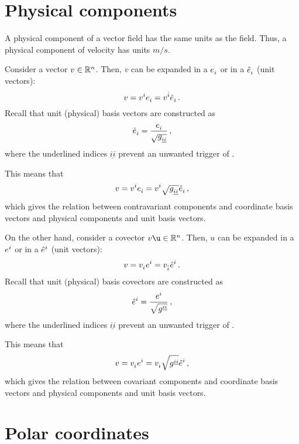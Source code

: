 \section{Physical components}
\label{sec:physical-components}

A physical component of a vector field has the same units as the field. Thus, a physical component of velocity has units $\si{m/s}$.

Consider a vector $v\in\mathbb{R}^n$. Then, $v$ can be expanded in a  $\tbvec i$ or in a  $\pbvec i$ (unit vectors):
%
\begin{equation*}
  v = \tvec vi\tbvec i = \pvec vi\pbvec i\,.
\end{equation*}
%
Recall that unit (physical) basis vectors are constructed as
%
\begin{equation*}
  \pbvec i = \dfrac{\tbvec i}{\sqrt{\pmetric ii}}\,,
\end{equation*}
%
where the underlined indices $\underline{ii}$ prevent an unwanted trigger of .

This means that
%
\begin{equation*}
  v = \tvec vi\tbvec i = \tvec vi\sqrt{\pmetric ii}\pbvec i\,,
\end{equation*}
%
which gives the relation between contravariant components and coordinate basis vectors and physical components and unit basis vectors.

On the other hand, consider a covector $v\u\in\reals^n$. Then, $u$ can be expanded in a  $\tbcov i$ or in a  $\pbcov i$ (unit vectors):
%
\begin{equation*}
  v = \tcov vi\tbcov i = \pcov vi\pbcov i\,.
\end{equation*}
%
Recall that unit (physical) basis covectors are constructed as
%
\begin{equation*}
  \pbcov i = \dfrac{\tbcov i}{\sqrt{\pimetric ii}}\,,
\end{equation*}
%
where the underlined indices $\underline{ii}$ prevent an unwanted trigger of .

This means that
%
\begin{equation*}
  v = \tcov vi\tbcov i = \tcov vi\sqrt{\pimetric ii}\pbcov i\,,
\end{equation*}
%
which gives the relation between covariant components and coordinate basis vectors and physical components and unit basis vectors.


\section{Polar coordinates}
\label{sec:polar-coordinates}


